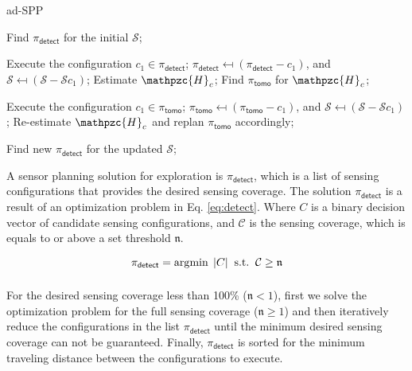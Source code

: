 \begin{algorithm}
	\caption{ad-SPP}
	\label{alg:1se}
	\begin{algorithmic}[1]
		\STATE Find $\pi_{\mathsf{detect}}$ for the initial $\mathcal{S}$; 
		
		\STATE Execute the configuration $c_1 \in \pi_{\mathsf{detect}}$;
		\STATE $\pi_{\mathsf{detect}} \mapsfrom (\pi_{\mathsf{detect}} - c_1) $, and $\mathcal{S} \mapsfrom (\mathcal{S} - \mathcal{S}{c_1} ) $;
		\STATE Estimate $\mathpzc{H}_c$;
		\STATE Find $\pi_{\mathsf{tomo}}$ for $\mathpzc{H}_c$;
		
		\STATE Execute the configuration $c_1 \in \pi_{\mathsf{tomo}}$;
		\STATE $\pi_{\mathsf{tomo}} \mapsfrom (\pi_{\mathsf{tomo}} - c_1) $, and $\mathcal{S} \mapsfrom (\mathcal{S} - \mathcal{S}{c_1} ) $;
		\STATE Re-estimate $\mathpzc{H}_c$ and replan $\pi_{\mathsf{tomo}}$ accordingly;
		\ENDWHILE
		
		\STATE Find new $\pi_{\mathsf{detect}}$ for the updated $\mathcal{S}$;%
		\ENDIF		
		\ENDWHILE		
	\end{algorithmic}
	\vskip 2pt
\end{algorithm}




A sensor planning solution for exploration is $\pi_{\mathsf{detect}}$, which is a list of sensing configurations that provides the desired sensing coverage. The solution $\pi_{\mathsf{detect}}$ is a result of an optimization problem in Eq. \ref{eq:detect}. Where $C$ is a binary decision vector of candidate sensing configurations, and $\mathcal{C}$ is the sensing coverage, which is equals to or above a set threshold $\mathfrak{n}$.

\begin{equation}
\pi_\mathsf{detect} = \displaystyle\operatorname*{\arg\!\min}_{} \; |C| \;\; \mbox{s.t.} \;\; \mathcal{C} \ge \mathfrak{n}
\label{eq:detect}
\end{equation}

For the desired sensing coverage less than 100\% ($\mathfrak{n} < 1$), first we solve the optimization problem for the full sensing coverage ($\mathfrak{n} \geq 1$) and then iteratively reduce the configurations in the list $\pi_\mathsf{detect}$ until the minimum desired sensing coverage can not be guaranteed. Finally, $\pi_\mathsf{detect}$ is sorted for the minimum traveling distance between the configurations to execute. %


